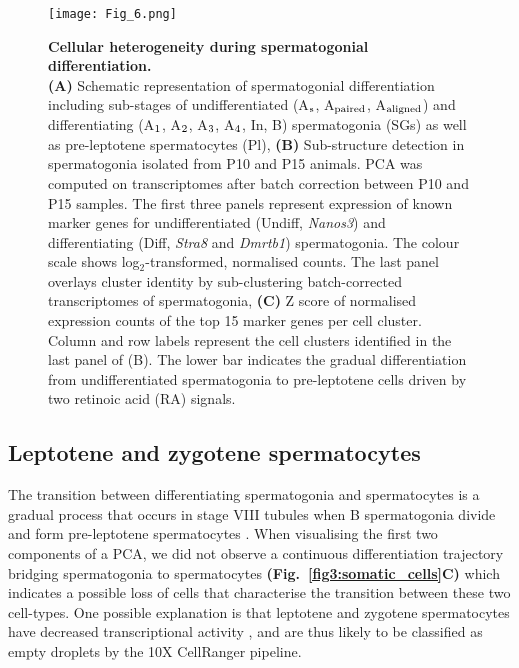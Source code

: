 \begin{figure}[!h]
\centering
\texttt{[image: Fig\_6.png]}
\caption[Cellular heterogeneity during spermatogonial differentiation]{\textbf{Cellular heterogeneity during spermatogonial differentiation.}\\
\textbf{(A)} Schematic representation of spermatogonial differentiation including sub-stages of undifferentiated (A$_\textnormal{s}$, A$_\textnormal{paired}$, A$_\textnormal{aligned}$) and differentiating (A$_\textnormal{1}$, A$_\textnormal{2}$, A$_\textnormal{3}$, A$_\textnormal{4}$, In, B) spermatogonia (SGs) as well as pre-leptotene spermatocytes (Pl), \textbf{(B)} Sub-structure detection in spermatogonia isolated from P10 and P15 animals. PCA was computed on transcriptomes after batch correction between P10 and P15 samples. The first three panels represent expression of known marker genes for undifferentiated (Undiff, \textit{Nanos3}) and differentiating (Diff, \textit{Stra8} and \textit{Dmrtb1}) spermatogonia. The colour scale shows log$_2$-transformed, normalised counts. The last panel overlays cluster identity by sub-clustering batch-corrected transcriptomes of spermatogonia, \textbf{(C)} Z score of normalised expression counts of the top 15 marker genes per cell cluster. Column and row labels represent the cell clusters identified in the last panel of (B). The lower bar indicates the gradual differentiation from undifferentiated spermatogonia to pre-leptotene cells driven by two retinoic acid (RA) signals. }
\label{fig3:spermatogonia}
\end{figure}

\newpage

\subsection{Leptotene and zygotene spermatocytes}

The transition between differentiating spermatogonia and spermatocytes is a gradual process that occurs in stage VIII tubules when B spermatogonia divide and form pre-leptotene spermatocytes \citep{Anderson2008, Baltus2006}. When visualising the first two components of a PCA, we did not observe a continuous differentiation trajectory bridging spermatogonia to spermatocytes \textbf{(Fig.~\ref{fig3:somatic_cells}C)} which indicates a possible loss of cells that characterise the transition between these two cell-types. One possible explanation is that leptotene and zygotene spermatocytes have decreased transcriptional activity \citep{Kierszenbaum1974, Monesi1965}, and are thus likely to be classified as empty droplets by the 10X CellRanger pipeline. \\

